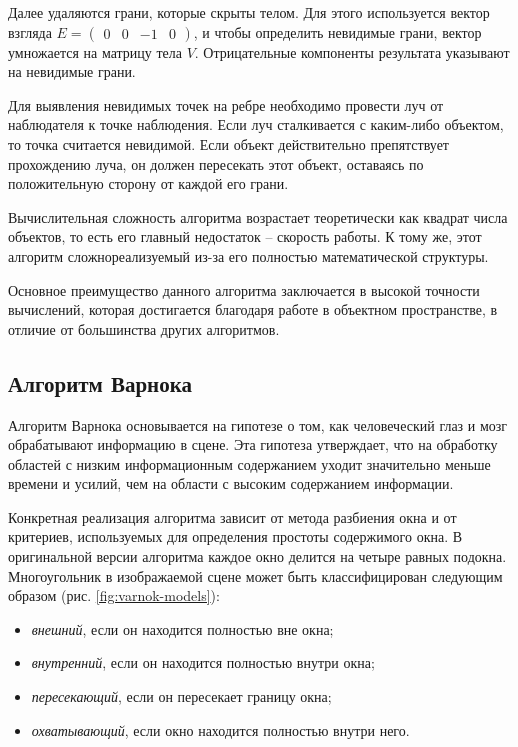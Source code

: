 Далее удаляются грани, которые скрыты телом. Для этого используется вектор взгляда $E = \begin{pmatrix} 0 & 0 & -1 & 0 \end{pmatrix}$, и чтобы определить невидимые грани, вектор умножается на матрицу тела $V$. Отрицательные компоненты результата указывают на невидимые грани.

Для выявления невидимых точек на ребре необходимо провести луч от наблюдателя к точке наблюдения. Если луч сталкивается с каким-либо объектом, то точка считается невидимой. Если объект действительно препятствует прохождению луча, он должен пересекать этот объект, оставаясь по положительную сторону от каждой его грани.

Вычислительная сложность алгоритма возрастает теоретически как квадрат числа объектов, то есть его главный недостаток -- скорость работы. К тому же, этот алгоритм сложнореализуемый из-за его полностью математической структуры.

Основное преимущество данного алгоритма заключается в высокой точности вычислений, которая достигается благодаря работе в объектном пространстве, в отличие от большинства других алгоритмов.

\subsection{Алгоритм Варнока}

Алгоритм Варнока основывается на гипотезе о том, как человеческий глаз и мозг обрабатывают информацию в сцене. Эта гипотеза утверждает, что на обработку областей с низким информационным содержанием уходит значительно меньше времени и усилий, чем на области с высоким содержанием информации.

Конкретная реализация алгоритма зависит от метода разбиения окна и от критериев, используемых для определения простоты содержимого окна. В оригинальной версии алгоритма каждое окно делится на четыре равных подокна. Многоугольник в изображаемой сцене может быть классифицирован следующим образом (рис. \ref{fig:varnok-models}):
\begin{itemize}[label=--]
	\item \textit{внешний}, если он находится полностью вне окна;
	\item \textit{внутренний}, если он находится полностью внутри окна;
	\item \textit{пересекающий}, если он пересекает границу окна;
	\item \textit{охватывающий}, если окно находится полностью внутри него.
\end{itemize}

